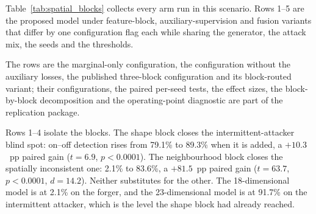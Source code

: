 \documentclass[notspecified,article,submit,moreauthors]{Definitions/mdpi}
\begin{document}
Table~\ref{tab:spatial_blocks} collects every arm run in this scenario. Rows 1--5 are the proposed model under feature-block, auxiliary-supervision and fusion variants that differ by one configuration flag each while sharing the generator, the attack mix, the seeds and the thresholds.

\begin{table}[!htbp]
  \centering
  \caption{Every arm run in the spatially inconsistent scenario (800 UAVs, malicious ratio 0.3, 20 evaluation seeds). Rows 1--5 are the proposed model under feature-block, auxiliary-supervision and fusion variants. Entries are detection rates in percent, benign spec. being one minus the false-positive rate, and Accuracy the overall mean. Bold marks the best value in the column.}
  \label{tab:spatial_blocks}
  \footnotesize
  \setlength{\tabcolsep}{2.5pt}
  \renewcommand{\arraystretch}{1.15}
\par
\vspace{2pt}
\raggedright\scriptsize
The rows are the marginal-only configuration, the configuration without the auxiliary losses, the published three-block configuration and its block-routed variant; their configurations, the paired per-seed tests, the effect sizes, the block-by-block decomposition and the operating-point diagnostic are part of the replication package.
\end{table}

Rows 1--4 isolate the blocks. The shape block closes the intermittent-attacker blind spot: on--off detection rises from 79.1\% to 89.3\% when it is added, a $+10.3$~pp paired gain ($t=6.9$, $p<0.0001$). The neighbourhood block closes the spatially inconsistent one: 2.1\% to 83.6\%, a $+81.5$~pp paired gain ($t=63.7$, $p<0.0001$, $d=14.2$). Neither substitutes for the other. The 18-dimensional model is at 2.1\% on the forger, and the 23-dimensional model is at 91.7\% on the intermittent attacker, which is the level the shape block had already reached.
\end{document}

